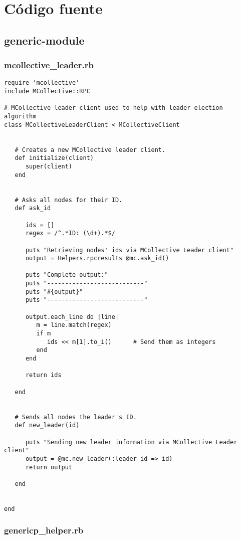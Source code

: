 \chapter{Código fuente}
\label{anx:codigo}


\section{generic-module}
\subsection{mcollective\_leader.rb}


\begin{lstlisting}
require 'mcollective'
include MCollective::RPC

# MCollective leader client used to help with leader election algorithm
class MCollectiveLeaderClient < MCollectiveClient
   
   
   # Creates a new MCollective leader client.
   def initialize(client)
      super(client)
   end
   
   
   # Asks all nodes for their ID.
   def ask_id
   
      ids = []
      regex = /^.*ID: (\d+).*$/
   
      puts "Retrieving nodes' ids via MCollective Leader client"
      output = Helpers.rpcresults @mc.ask_id()
      
      puts "Complete output:"
      puts "---------------------------"
      puts "#{output}"
      puts "---------------------------"
      
      output.each_line do |line|
         m = line.match(regex)
         if m
            ids << m[1].to_i()      # Send them as integers
         end
      end
      
      return ids
   
   end
   
   
   # Sends all nodes the leader's ID.
   def new_leader(id)
   
      puts "Sending new leader information via MCollective Leader client"
      output = @mc.new_leader(:leader_id => id)
      return output
   
   end
   
   
end
\end{lstlisting}


\subsection{genericp\_helper.rb}


